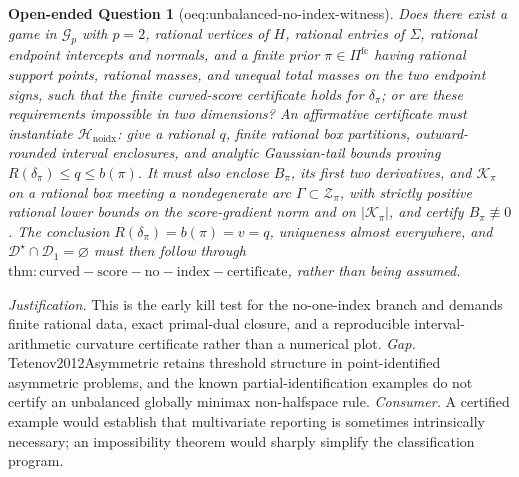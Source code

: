 \documentclass{article}
\newtheorem{openendedquestion}{Open-ended Question}
\begin{document}
\begin{openendedquestion}[oeq:unbalanced-no-index-witness]\label{oeq:unbalanced-no-index-witness}
Does there exist a game in \(\mathcal G_p\) with \(p=2\), rational vertices of \(H\), rational entries of \(\Sigma\), rational endpoint intercepts and normals, and a finite prior \(\pi\in\Pi^{\mathrm{fc}}\) having rational support points, rational masses, and unequal total masses on the two endpoint signs, such that the finite curved-score certificate holds for \(\delta_{\pi}\); or are these requirements impossible in two dimensions? An affirmative certificate must instantiate \(\mathscr H_{\mathrm{noidx}}\): give a rational \(q\), finite rational box partitions, outward-rounded interval enclosures, and analytic Gaussian-tail bounds proving \(R(\delta_{\pi})\le q\le b(\pi)\). It must also enclose \(B_{\pi}\), its first two derivatives, and \(\mathcal K_{\pi}\) on a rational box meeting a nondegenerate arc \(\Gamma\subset\mathcal Z_{\pi}\), with strictly positive rational lower bounds on the score-gradient norm and on \( |\mathcal K_{\pi}|\), and certify \(B_{\pi}\not\equiv0\). The conclusion \(R(\delta_{\pi})=b(\pi)=v=q\), uniqueness almost everywhere, and \(\mathcal D^{\star}\cap\mathcal D_1=\varnothing\) must then follow through \(\mathrm{thm:curved-score-no-index-certificate}\), rather than being assumed.
\end{openendedquestion}
\par\smallskip\noindent \textit{Justification.} This is the early kill test for the no-one-index branch and demands finite rational data, exact primal-dual closure, and a reproducible interval-arithmetic curvature certificate rather than a numerical plot. \textit{Gap.} Tetenov2012Asymmetric retains threshold structure in point-identified asymmetric problems, and the known partial-identification examples do not certify an unbalanced globally minimax non-halfspace rule. \textit{Consumer.} A certified example would establish that multivariate reporting is sometimes intrinsically necessary; an impossibility theorem would sharply simplify the classification program.
\end{document}
